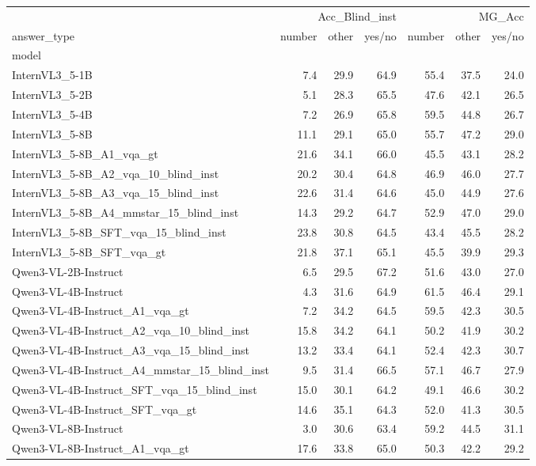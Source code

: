\begin{tabular}{lrrrrrr}
\toprule
 & \multicolumn{3}{r}{Acc_Blind_inst} & \multicolumn{3}{r}{MG_Acc} \\
answer_type & number & other & yes/no & number & other & yes/no \\
model &  &  &  &  &  &  \\
\midrule
InternVL3_5-1B & 7.4 & 29.9 & 64.9 & 55.4 & 37.5 & 24.0 \\
InternVL3_5-2B & 5.1 & 28.3 & 65.5 & 47.6 & 42.1 & 26.5 \\
InternVL3_5-4B & 7.2 & 26.9 & 65.8 & 59.5 & 44.8 & 26.7 \\
InternVL3_5-8B & 11.1 & 29.1 & 65.0 & 55.7 & 47.2 & 29.0 \\
InternVL3_5-8B_A1_vqa_gt & 21.6 & 34.1 & 66.0 & 45.5 & 43.1 & 28.2 \\
InternVL3_5-8B_A2_vqa_10_blind_inst & 20.2 & 30.4 & 64.8 & 46.9 & 46.0 & 27.7 \\
InternVL3_5-8B_A3_vqa_15_blind_inst & 22.6 & 31.4 & 64.6 & 45.0 & 44.9 & 27.6 \\
InternVL3_5-8B_A4_mmstar_15_blind_inst & 14.3 & 29.2 & 64.7 & 52.9 & 47.0 & 29.0 \\
InternVL3_5-8B_SFT_vqa_15_blind_inst & 23.8 & 30.8 & 64.5 & 43.4 & 45.5 & 28.2 \\
InternVL3_5-8B_SFT_vqa_gt & 21.8 & 37.1 & 65.1 & 45.5 & 39.9 & 29.3 \\
Qwen3-VL-2B-Instruct & 6.5 & 29.5 & 67.2 & 51.6 & 43.0 & 27.0 \\
Qwen3-VL-4B-Instruct & 4.3 & 31.6 & 64.9 & 61.5 & 46.4 & 29.1 \\
Qwen3-VL-4B-Instruct_A1_vqa_gt & 7.2 & 34.2 & 64.5 & 59.5 & 42.3 & 30.5 \\
Qwen3-VL-4B-Instruct_A2_vqa_10_blind_inst & 15.8 & 34.2 & 64.1 & 50.2 & 41.9 & 30.2 \\
Qwen3-VL-4B-Instruct_A3_vqa_15_blind_inst & 13.2 & 33.4 & 64.1 & 52.4 & 42.3 & 30.7 \\
Qwen3-VL-4B-Instruct_A4_mmstar_15_blind_inst & 9.5 & 31.4 & 66.5 & 57.1 & 46.7 & 27.9 \\
Qwen3-VL-4B-Instruct_SFT_vqa_15_blind_inst & 15.0 & 30.1 & 64.2 & 49.1 & 46.6 & 30.2 \\
Qwen3-VL-4B-Instruct_SFT_vqa_gt & 14.6 & 35.1 & 64.3 & 52.0 & 41.3 & 30.5 \\
Qwen3-VL-8B-Instruct & 3.0 & 30.6 & 63.4 & 59.2 & 44.5 & 31.1 \\
Qwen3-VL-8B-Instruct_A1_vqa_gt & 17.6 & 33.8 & 65.0 & 50.3 & 42.2 & 29.2 \\

\end{tabular}
